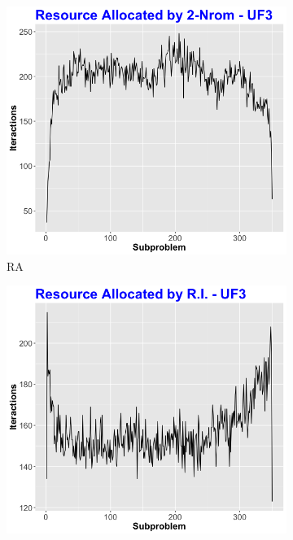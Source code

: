 \begin{figure}[!t]
	
	\begin{subfigure}[b]{0.33\textwidth}
		\centering
		\includegraphics[width=1\textwidth, height=1\textwidth]{images/Ra-norm-uf3}
		\caption{RA}
	\end{subfigure}
	\begin{subfigure}[b]{0.33\textwidth}
		\centering
		\includegraphics[width=1\textwidth, height=1\textwidth]{images/Ra-gra-uf3}

\end{subfigure}
\end{figure}
